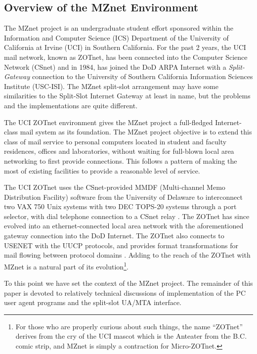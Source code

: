 \subsection*	{Overview of the MZnet Environment}
The MZnet project is an undergraduate student effort sponsored within 
the Information and Computer Science (ICS) Department of the 
University of California at Irvine (UCI) in Southern California.  
For the past 2 years, the UCI mail network, known as
ZOTnet, has been connected into the Computer Science 
Network (CSnet) and in 1984, has joined the DoD ARPA Internet with a 
{\it Split-Gateway} connection \cite{Rose84}
to the University of Southern California 
Information Sciences Institute (USC-ISI).  
The MZnet split-slot arrangement may have some similarities to the 
Split-Slot Internet Gateway
at least in name, 
but the problems and the implementations are quite different.  

The UCI ZOTnet environment \cite{Rose83-1}
gives the MZnet project a full-fledged
Internet-class mail system as its foundation.  
The MZnet project objective is to extend this class 
of mail service to personal computers located in student and faculty 
residences, offices and laboratories, without waiting for full-blown 
local area networking to first provide connections.  
This follows a pattern of making the most of existing facilities 
to provide a reasonable level of service.

The UCI ZOTnet uses the CSnet-provided MMDF
(Multi-channel Memo Distribution Facility) software \cite{MMDF}
from the University of Delaware to interconnect 
two VAX 750 Unix systems with two DEC TOPS-20 systems 
through a port selector, with dial telephone connection to a CSnet relay
\cite{CSNET-UCI}.
The ZOTnet has since evolved into an ethernet-connected 
local area network with the aforementioned
gateway connection into the DoD Internet.
The ZOTnet also connects to USENET with the UUCP protocols,
and provides format transformations for mail flowing between 
protocol domains
\cite{Rose83-2,RFC-MMM}.
Adding to the reach of the ZOTnet with MZnet 
is a natural part of its evolution\footnote{For those who are
properly curious about such things, 
the name ``ZOTnet'' derives from the cry of the UCI mascot which 
is the Anteater from the B.C. comic strip, and MZnet is simply 
a contraction for Micro-ZOTnet.}.

To this point we have set the context of the MZnet project.
The remainder of this paper is devoted to relatively technical 
discussions of implementation of the PC user agent programs 
and the split-slot UA/MTA interface. 

